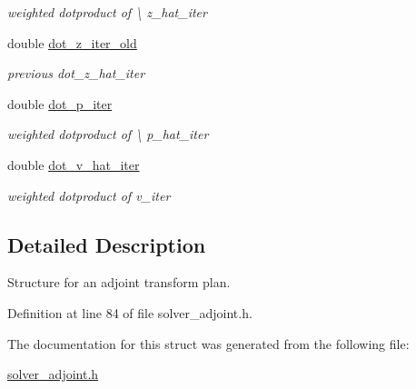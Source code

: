\begin{DoxyCompactItemize}
\begin{DoxyCompactList}\small\item\em weighted dotproduct of \textbackslash{} z\-\_\-hat\-\_\-iter \end{DoxyCompactList}\item 
\hypertarget{structimri__inh__2d1d__adjoint__plan_a92ceaf9529a44c28fd3b6d9d63c0c13f}{double \hyperlink{structimri__inh__2d1d__adjoint__plan_a92ceaf9529a44c28fd3b6d9d63c0c13f}{dot\-\_\-z\-\_\-iter\-\_\-old}}\label{structimri__inh__2d1d__adjoint__plan_a92ceaf9529a44c28fd3b6d9d63c0c13f}

\begin{DoxyCompactList}\small\item\em previous dot\-\_\-z\-\_\-hat\-\_\-iter \end{DoxyCompactList}\item 
\hypertarget{structimri__inh__2d1d__adjoint__plan_a00c75acfb362339a30d2809520fcd775}{double \hyperlink{structimri__inh__2d1d__adjoint__plan_a00c75acfb362339a30d2809520fcd775}{dot\-\_\-p\-\_\-iter}}\label{structimri__inh__2d1d__adjoint__plan_a00c75acfb362339a30d2809520fcd775}

\begin{DoxyCompactList}\small\item\em weighted dotproduct of \textbackslash{} p\-\_\-hat\-\_\-iter \end{DoxyCompactList}\item 
\hypertarget{structimri__inh__2d1d__adjoint__plan_aed3f646cabd7b8ab1a480d7607ea45f3}{double \hyperlink{structimri__inh__2d1d__adjoint__plan_aed3f646cabd7b8ab1a480d7607ea45f3}{dot\-\_\-v\-\_\-hat\-\_\-iter}}\label{structimri__inh__2d1d__adjoint__plan_aed3f646cabd7b8ab1a480d7607ea45f3}

\begin{DoxyCompactList}\small\item\em weighted dotproduct of v\-\_\-iter \end{DoxyCompactList}\end{DoxyCompactItemize}


\subsection{Detailed Description}
Structure for an adjoint transform plan. 

Definition at line 84 of file solver\-\_\-adjoint.\-h.



The documentation for this struct was generated from the following file\-:\begin{DoxyCompactItemize}
\item 
\hyperlink{solver__adjoint_8h}{solver\-\_\-adjoint.\-h}\end{DoxyCompactItemize}
